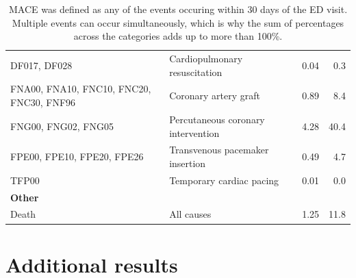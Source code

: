 \documentclass[preprint]{elsarticle}
\begin{document}
\begin{table}[H]
\begin{adjustbox}{center}
\begin{tabular}{@{}p{3.1cm}lrr@{}}
DF017, DF028                                  & Cardiopulmonary resuscitation                          &  0.04       &    0.3   \\
FNA00, FNA10, FNC10, FNC20, FNC30, FNF96      & Coronary artery graft                                  &  0.89       &    8.4   \\
FNG00, FNG02, FNG05                           & Percutaneous coronary intervention                     &  4.28       &   40.4   \\
FPE00, FPE10, FPE20, FPE26                    & Transvenous pacemaker insertion                        &  0.49       &    4.7   \\
TFP00                                         & Temporary cardiac pacing                               &  0.01       &    0.0   \\
\midrule
\textbf{Other} & & & \\
\midrule
Death                                         & All causes                                             &  1.25       &   11.8   \\

\bottomrule
\end{tabular}
\end{adjustbox}
\caption{MACE was defined as any of the events occuring within 30 days of the ED visit. Multiple events can occur simultaneously, which is why the sum of percentages across the categories adds up to more than 100\%.}
\label{table:appendix:mace}
\end{table}
\renewcommand{\arraystretch}{1}


\section{Additional results}
\label{sec:appendix:results}
\end{document}
